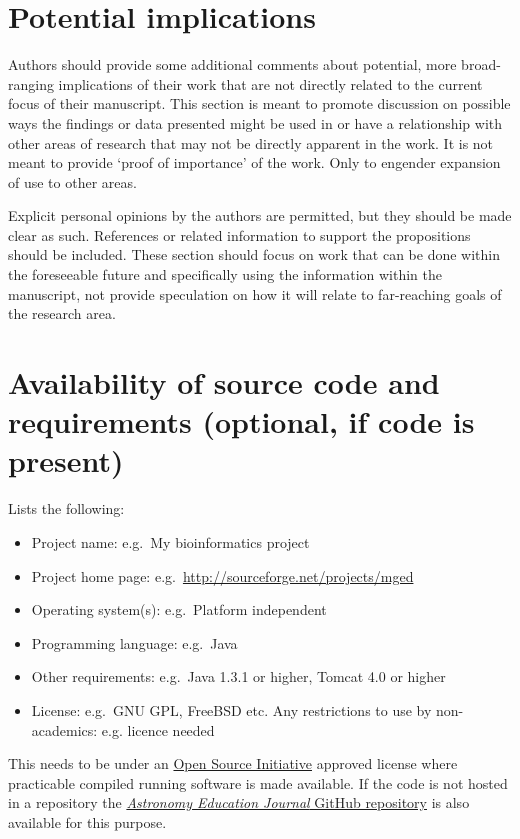 \documentclass[a4paper,alpha-refs]{aejstyles}
\begin{document}
\section{Potential implications}

Authors should provide some additional comments about potential, more broad-ranging implications of their work that are not directly related to the current focus of their manuscript. This section is meant to promote discussion on possible ways the findings or data presented might be used in or have a relationship with other areas of research that may not be directly apparent in the work. It is not meant to provide `proof of importance' of the work. Only to engender expansion of use to other areas. 

Explicit personal opinions by the authors are permitted, but they should be made clear as such. References or related information to support the propositions should be included. These section should focus on work that can be done within the foreseeable future and specifically using the information within the manuscript, not provide speculation on how it will relate to far-reaching goals of the research area.


\section{Availability of source code and requirements (optional, if code is present)}

Lists the following:
\begin{itemize}
\item Project name: e.g.~My bioinformatics project
\item Project home page: e.g.~\url{http://sourceforge.net/projects/mged}
\item Operating system(s): e.g.~Platform independent
\item Programming language: e.g.~Java
\item Other requirements: e.g.~Java 1.3.1 or higher, Tomcat 4.0 or higher
\item License: e.g.~GNU GPL, FreeBSD etc.
Any restrictions to use by non-academics: e.g. licence needed
\end{itemize}

This needs to be under an \href{http:/opensource.org/licenses}{Open Source Initiative} approved license where practicable compiled running software is made available. If the code is not hosted in a repository the \href{https://github.com/Astronomy Education Journal}{\textit{Astronomy Education Journal} GitHub repository} is also available for this purpose.
\end{document}
